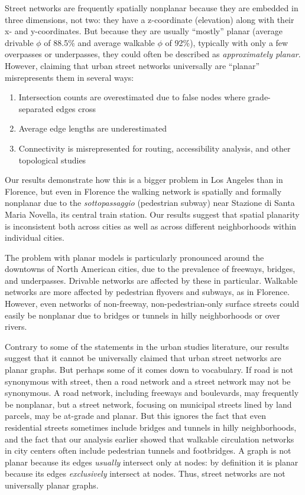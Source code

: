 \documentclass[Afour,sageh,times]{sagej}
\begin{document}
Street networks are frequently spatially nonplanar because they are embedded in three dimensions, not two: they have a z-coordinate (elevation) along with their x- and y-coordinates. But because they are usually \enquote{mostly} planar (average drivable $\phi$ of 88.5\% and average walkable $\phi$ of 92\%), typically with only a few overpasses or underpasses, they could often be described as \emph{approximately planar}. However, claiming that urban street networks universally are \enquote{planar} misrepresents them in several ways:

\begin{enumerate}
	\item{Intersection counts are overestimated due to false nodes where grade-separated edges cross}
	\item{Average edge lengths are underestimated}
	\item{Connectivity is misrepresented for routing, accessibility analysis, and other topological studies}
\end{enumerate}

Our results demonstrate how this is a bigger problem in Los Angeles than in Florence, but even in Florence the walking network is spatially and formally nonplanar due to the \textit{sottopassaggio} (pedestrian subway) near Stazione di Santa Maria Novella, its central train station. Our results suggest that spatial planarity is inconsistent both across cities as well as across different neighborhoods within individual cities.

The problem with planar models is particularly pronounced around the downtowns of North American cities, due to the prevalence of freeways, bridges, and underpasses. Drivable networks are affected by these in particular. Walkable networks are more affected by pedestrian flyovers and subways, as in Florence. However, even networks of non-freeway, non-pedestrian-only surface streets could easily be nonplanar due to bridges or tunnels in hilly neighborhoods or over rivers.

Contrary to some of the statements in the urban studies literature, our results suggest that it cannot be universally claimed that urban street networks are planar graphs. But perhaps some of it comes down to vocabulary. If road is not synonymous with street, then a road network and a street network may not be synonymous. A road network, including freeways and boulevards, may frequently be nonplanar, but a street network, focusing on municipal streets lined by land parcels, may be at-grade and planar. But this ignores the fact that even residential streets sometimes include bridges and tunnels in hilly neighborhoods, and the fact that our analysis earlier showed that walkable circulation networks in city centers often include pedestrian tunnels and footbridges. A graph is not planar because its edges \emph{usually} intersect only at nodes: by definition it is planar because its edges \emph{exclusively} intersect at nodes. Thus, street networks are not universally planar graphs. 
\end{document}
